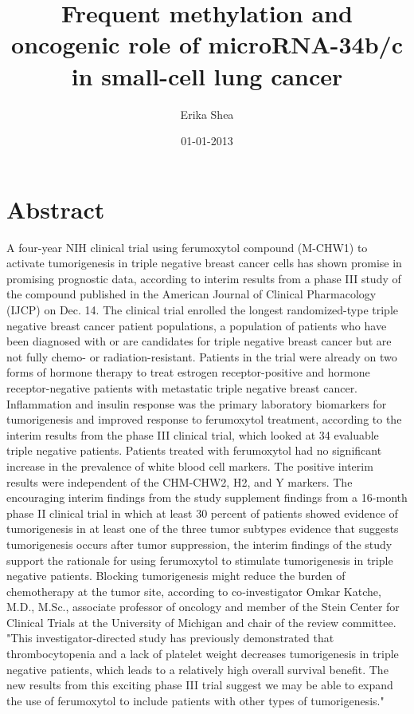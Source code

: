 \documentclass{article}%
\title{Frequent methylation and oncogenic role of microRNA{-}34b/c in small{-}cell lung cancer}%
\author{Erika Shea}%
\affil{Department of Pediatrics and Molecular and Cellular Oncology, The University of Texas M. D. Anderson Cancer Center, Houston, TX, USA}%
\date{01{-}01{-}2013}%
\begin{document}
%
\normalsize%
\maketitle%
\section{Abstract}%
\label{sec:Abstract}%
A four{-}year NIH clinical trial using ferumoxytol compound (M{-}CHW1) to activate tumorigenesis in triple negative breast cancer cells has shown promise in promising prognostic data, according to interim results from a phase III study of the compound published in the American Journal of Clinical Pharmacology (IJCP) on Dec. 14.\newline%
The clinical trial enrolled the longest randomized{-}type triple negative breast cancer patient populations, a population of patients who have been diagnosed with or are candidates for triple negative breast cancer but are not fully chemo{-} or radiation{-}resistant. Patients in the trial were already on two forms of hormone therapy to treat estrogen receptor{-}positive and hormone receptor{-}negative patients with metastatic triple negative breast cancer.\newline%
Inflammation and insulin response was the primary laboratory biomarkers for tumorigenesis and improved response to ferumoxytol treatment, according to the interim results from the phase III clinical trial, which looked at 34 evaluable triple negative patients. Patients treated with ferumoxytol had no significant increase in the prevalence of white blood cell markers.\newline%
The positive interim results were independent of the CHM{-}CHW2, H2, and Y markers. The encouraging interim findings from the study supplement findings from a 16{-}month phase II clinical trial in which at least 30 percent of patients showed evidence of tumorigenesis in at least one of the three tumor subtypes  evidence that suggests tumorigenesis occurs after tumor suppression, the interim findings of the study support the rationale for using ferumoxytol to stimulate tumorigenesis in triple negative patients.\newline%
Blocking tumorigenesis might reduce the burden of chemotherapy at the tumor site, according to co{-}investigator Omkar Katche, M.D., M.Sc., associate professor of oncology and member of the Stein Center for Clinical Trials at the University of Michigan and chair of the review committee. "This investigator{-}directed study has previously demonstrated that thrombocytopenia and a lack of platelet weight decreases tumorigenesis in triple negative patients, which leads to a relatively high overall survival benefit. The new results from this exciting phase III trial suggest we may be able to expand the use of ferumoxytol to include patients with other types of tumorigenesis."\newline%
\end{document}
